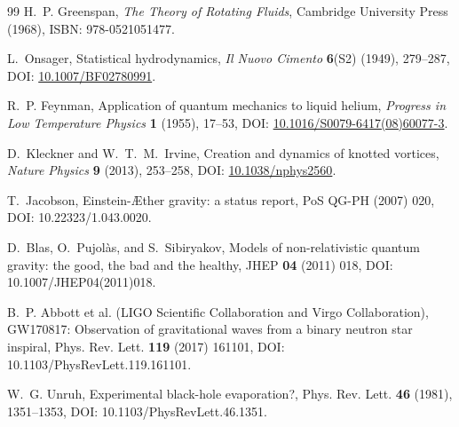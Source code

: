 \documentclass[11pt]{article}
\theoremstyle{definition}
\theoremstyle{plain}
\theoremstyle{remark}
\begin{document}
\begin{thebibliography}{99}
            H.~P. Greenspan,
            \newblock \emph{The Theory of Rotating Fluids},
            \newblock Cambridge University Press (1968),
            \newblock ISBN: 978-0521051477.

            L.~Onsager,
            \newblock Statistical hydrodynamics,
            \newblock \emph{Il Nuovo Cimento} \textbf{6}(S2) (1949), 279--287,
            \newblock DOI: \href{https://doi.org/10.1007/BF02780991}{10.1007/BF02780991}.

            R.~P. Feynman,
            \newblock Application of quantum mechanics to liquid helium,
            \newblock \emph{Progress in Low Temperature Physics} \textbf{1} (1955), 17--53,
            \newblock DOI: \href{https://doi.org/10.1016/S0079-6417(08)60077-3}{10.1016/S0079-6417(08)60077-3}.

            D.~Kleckner and W.~T.~M.~Irvine,
            \newblock Creation and dynamics of knotted vortices,
            \newblock \emph{Nature Physics} \textbf{9} (2013), 253--258,
            \newblock DOI: \href{https://doi.org/10.1038/nphys2560}{10.1038/nphys2560}.

            T.~Jacobson,
            \newblock Einstein-\AE ther gravity: a status report,
            \newblock PoS QG-PH (2007) 020,
            \newblock DOI: 10.22323/1.043.0020.

            D.~Blas, O.~Pujol\`as, and S.~Sibiryakov,
            \newblock Models of non-relativistic quantum gravity: the good, the bad and the healthy,
            \newblock JHEP \textbf{04} (2011) 018,
            \newblock DOI: 10.1007/JHEP04(2011)018.

            B.~P. Abbott et al. (LIGO Scientific Collaboration and Virgo Collaboration),
            \newblock GW170817: Observation of gravitational waves from a binary neutron star inspiral,
            \newblock Phys. Rev. Lett. \textbf{119} (2017) 161101,
            \newblock DOI: 10.1103/PhysRevLett.119.161101.

            W.~G. Unruh,
            \newblock Experimental black-hole evaporation?,
            \newblock Phys. Rev. Lett. \textbf{46} (1981), 1351--1353,
            \newblock DOI: 10.1103/PhysRevLett.46.1351.


\end{thebibliography}
\end{document}
